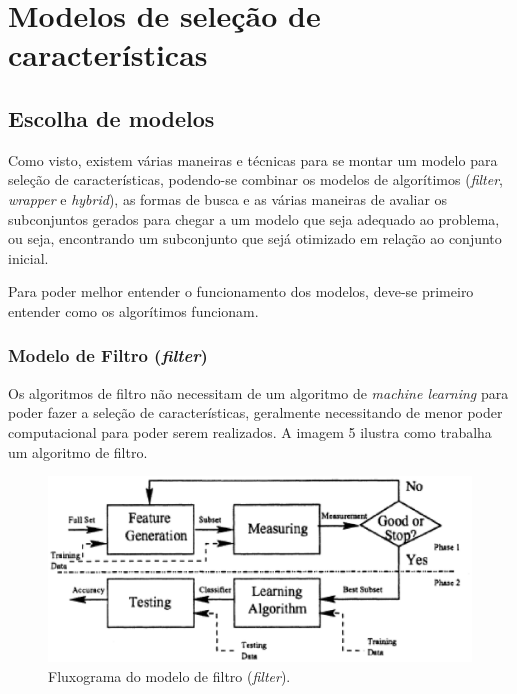 \chapter[Modelos de seleção de características]{Modelos de seleção de características}

\section{Escolha de modelos}

Como visto, existem várias maneiras e técnicas para se montar um modelo para seleção de características, podendo-se combinar os modelos de algorítimos (\textit{filter}, \textit{wrapper} e \textit{hybrid}), as formas de busca e as várias maneiras de avaliar os subconjuntos gerados para chegar a um modelo que seja adequado ao problema, ou seja, encontrando um subconjunto que sejá otimizado em relação ao conjunto inicial.

Para poder melhor entender o funcionamento dos modelos, deve-se primeiro entender como os algorítimos funcionam.

\subsection{Modelo de Filtro (\textit{filter})}

Os algoritmos de filtro não necessitam de um algoritmo de \textit{machine learning} para poder fazer a seleção de características, geralmente necessitando de menor poder computacional para poder serem realizados. A imagem 5 ilustra como trabalha um algoritmo de filtro.

\begin{figure}[h]
	\centering
	\label{fig05}
		\includegraphics[keepaspectratio=true,scale=1]{figuras/fig05.eps}
	\caption{Fluxograma do modelo de filtro (\textit{filter}). \cite{huan_1998}}
\end{figure}

